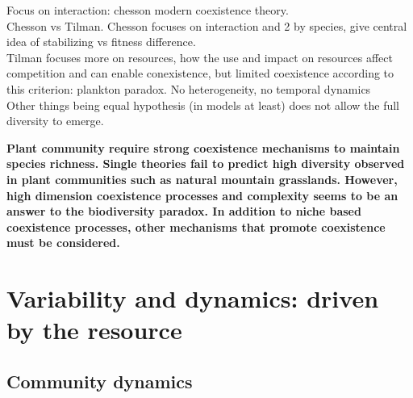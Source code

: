 Focus on interaction: chesson modern coexistence theory.\\

Chesson vs Tilman. 
Chesson focuses on interaction and 2 by species, give central idea of stabilizing vs fitness difference.\\
Tilman focuses more on resources, how the use and impact on resources affect competition and can enable conexistence, but limited coexistence according to this criterion: plankton paradox. No heterogeneity, no temporal dynamics\\

Other things being equal hypothesis (in models at least) does not allow the full diversity to emerge.\\

\parencite{clark_resolving_2007}



\textbf{Plant community require strong coexistence mechanisms to maintain species richness. Single theories fail to predict high diversity observed in plant communities such as natural mountain grasslands. However, high dimension coexistence processes and complexity seems to be an answer to the biodiversity paradox. In addition to niche based coexistence processes, other mechanisms that promote coexistence must be considered.}




 \section{Variability and dynamics: driven by the resource}




\subsection{Community dynamics}

